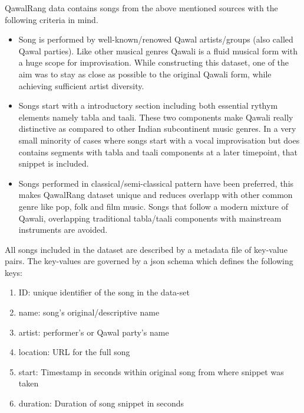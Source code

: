\documentclass{article}
\begin{document}
QawalRang data contains songs from the above mentioned sources with the following criteria in mind.
\begin{itemize}
\item Song is performed by well-known/renowed Qawal artists/groups (also called Qawal parties). Like other musical genres Qawali is a fluid musical form with a huge scope for improvisation. While constructing this dataset, one of the aim was to stay as close as possible to the original Qawali form, while achieving sufficient artist diversity.
\item Songs start with a introductory section including both essential rythym elements namely tabla and taali. These two components make Qawali really distinctive as compared to other Indian subcontinent music genres. In a very small minority of cases where songs start with a vocal improvisation but does contains segments with tabla and taali components at a later timepoint, that snippet is included.
\item Songs performed in classical/semi-classical pattern have been preferred, this makes QawalRang dataset unique and reduces overlapp with other common genre like pop, folk and film music. Songs that follow a modern mixture of Qawali, overlapping traditional tabla/taali components with mainstream instruments are avoided.
\end{itemize}

All songs included in the dataset are described by a metadata file of key-value pairs. The key-values are governed by a json schema which defines the following keys:
\begin{enumerate}
\item ID: unique identifier of the song in the data-set
\item name: song's original/descriptive name
\item artist: performer's or Qawal party's name
\item location: URL for the full song
\item start: Timestamp in seconds within original song from where snippet was taken
\item duration: Duration of song snippet in seconds
\end{enumerate}
\end{document}
